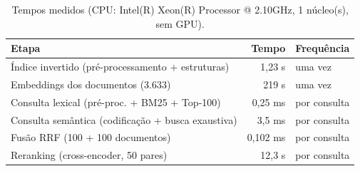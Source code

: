 \begin{table}[t]
\centering
\caption{Tempos medidos (CPU: Intel(R) Xeon(R) Processor @ 2.10GHz, 1 núcleo(s), sem GPU).}
\label{tab:times}
\small
\begin{tabular}{lrl}
\toprule
Etapa & Tempo & Frequência \\
\midrule
Índice invertido (pré-processamento + estruturas) & 1,23 s & uma vez \\
Embeddings dos documentos (3.633) & 219 s & uma vez \\
Consulta lexical (pré-proc. + BM25 + Top-100) & 0,25 ms & por consulta \\
Consulta semântica (codificação + busca exaustiva) & 3,5 ms & por consulta \\
Fusão RRF (100 + 100 documentos) & 0,102 ms & por consulta \\
Reranking (cross-encoder, 50 pares) & 12,3 s & por consulta \\
\bottomrule
\end{tabular}
\end{table}
